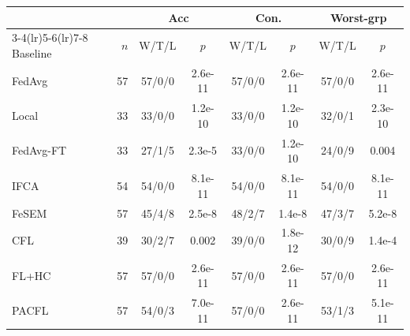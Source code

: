 \begin{tabular}{lrcccccc}
\toprule
& & \multicolumn{2}{c}{Acc} & \multicolumn{2}{c}{Con.} & \multicolumn{2}{c}{Worst-grp} \\
\cmidrule(lr){3-4}\cmidrule(lr){5-6}\cmidrule(lr){7-8}
Baseline & $n$ & W/T/L & $p$ & W/T/L & $p$ & W/T/L & $p$ \\
\midrule
FedAvg & 57 & 57/0/0 & 2.6e-11 & 57/0/0 & 2.6e-11 & 57/0/0 & 2.6e-11 \\
Local & 33 & 33/0/0 & 1.2e-10 & 33/0/0 & 1.2e-10 & 32/0/1 & 2.3e-10 \\
FedAvg-FT & 33 & 27/1/5 & 2.3e-5 & 33/0/0 & 1.2e-10 & 24/0/9 & 0.004 \\
IFCA & 54 & 54/0/0 & 8.1e-11 & 54/0/0 & 8.1e-11 & 54/0/0 & 8.1e-11 \\
FeSEM & 57 & 45/4/8 & 2.5e-8 & 48/2/7 & 1.4e-8 & 47/3/7 & 5.2e-8 \\
CFL & 39 & 30/2/7 & 0.002 & 39/0/0 & 1.8e-12 & 30/0/9 & 1.4e-4 \\
FL+HC & 57 & 57/0/0 & 2.6e-11 & 57/0/0 & 2.6e-11 & 57/0/0 & 2.6e-11 \\
PACFL & 57 & 54/0/3 & 7.0e-11 & 57/0/0 & 2.6e-11 & 53/1/3 & 5.1e-11 \\
\bottomrule
\end{tabular}
